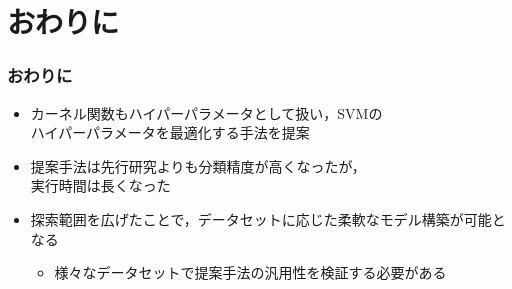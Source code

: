 \documentclass[11pt,dvipdfmx,cjk]{beamer}
\begin{document}
\section{おわりに}
\begin{frame}
  \frametitle{おわりに}
  \begin{itemize}
    \item カーネル関数もハイパーパラメータとして扱い，SVMの\\ハイパーパラメータを最適化する手法を提案
  \item 提案手法は先行研究よりも分類精度が高くなったが，\\実行時間は長くなった
  \item 探索範囲を広げたことで，データセットに応じた柔軟なモデル構築が可能となる
   \begin{itemize}
  \item 様々なデータセットで提案手法の汎用性を検証する必要がある
\end{itemize}
  \end{itemize}
\end{frame}
  
\end{document}

